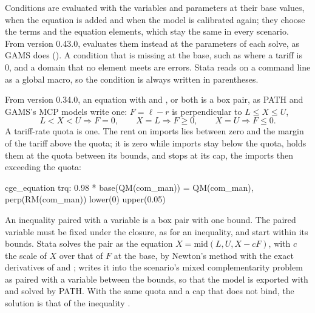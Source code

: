 Conditions are evaluated with the variables and parameters at their base
values, when the equation is added and when the model is calibrated again; they
choose the terms and the equation elements, which stay the same in every
scenario. From version 0.43.0, 
evaluates them instead at the parameters of each solve, as GAMS does
(). A condition that is missing at the base, such as 
where a tariff is 0, and a domain that no element meets are errors. Stata
reads \cmd{$} on a command line as a global macro, so the
condition is always written in parentheses.


From version 0.34.0, an equation with \cmd{)} and
,  or both is a box pair, as PATH and GAMS's
MCP models write one: $F = \ell - r$ is perpendicular to $L \le X \le U$,
\begin{equation*}
L < X < U \Rightarrow F = 0, \qquad X = L \Rightarrow F \ge 0, \qquad X = U \Rightarrow F \le 0.
\end{equation*}
A tariff-rate quota is one. The rent on imports lies between zero and the
margin of the tariff above the quota; it is zero while imports stay below the
quota, holds them at the quota between its bounds, and stops at its cap, the
imports then exceeding the quota:
\begin{stcode}
cge_equation trq: 0.98 * base(QM(com_man)) = QM(com_man), perp(RM(com_man)) lower(0) upper(0.05)
\end{stcode}
An inequality paired with a variable is a box pair with one bound. The paired
variable must be fixed under the closure, as for an inequality, and start
within its bounds. Stata solves the pair as the equation
$X = \mathrm{mid}(L, U, X - cF)$, with $c$ the scale of $X$ over that of $F$
at the base, by Newton's method with the exact derivatives of  and
;  writes it into the scenario's mixed
complementarity problem as  paired with a variable between the
bounds, so that the model is exported with  and solved by PATH.
With the same quota and a cap that does not bind, the solution is that of the
inequality .


